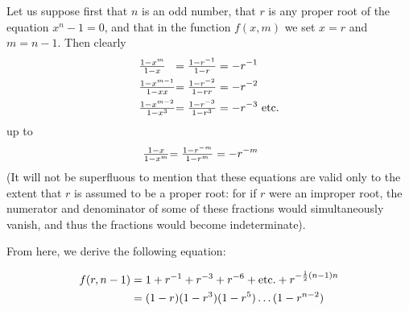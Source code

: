 \documentclass[twoside,12pt]{memoir}
\let\oldfrac\frac
\def\frac#1#2{\mathchoice{\tfrac{#1}{#2}}{\oldfrac{#1}{#2}}{\genfrac{}{}{}{2}{#1}{#2\mathstrut}}{\genfrac{}{}{}{3}{#1}{#2\mathstrut}}}
\begin{document}
Let us suppose first that \(n\) is an odd number, that \(r\) is any proper root of the equation \(x^{n}-1=0\), and that in the function \(f(x, m)\) we set \(x=r\) and \(m=n-1\). Then clearly
\[\begin{alignedat}[t]{3}
& \frac{1-x^{m}}{1-x}&=\frac{1-r^{-1}}{1-r}&=-r^{-1} \\
& \frac{1-x^{m-1}}{1-x x}&=\frac{1-r^{-2}}{1-r r}&=-r^{-2} \\
& \frac{1-x^{m-2}}{1-x^{3}}&=\frac{1-r^{-3}}{1-r^{3}}&=-r^{-3} \text{ etc{.}}
\end{alignedat}\]
up to
\[\begin{alignedat}[t]{3}
&\frac{1-x}{1-x^{m}}&=\frac{1-r^{-m}}{1-r^{m}}&=-r^{-m}\phantom{\text{etc{.}}}
\end{alignedat}\]
(It will not be superfluous to mention that these equations are valid only to the extent that \(r\) is assumed to be a proper root: for if \(r\) were an improper root, the numerator and denominator of some of these fractions would simultaneously vanish, and thus the fractions would become indeterminate).
%

From here, we derive the following equation:

\[\begin{aligned}
f(r, n-1) & =1+r^{-1}+r^{-3}+r^{-6}+\text{etc{.}}+r^{-\frac{1}{2}(n-1) n} \\
& =(1-r)(1-r^{3})(1-r^{5}) \ldots(1-r^{n-2})
\end{aligned}\]
%
\end{document}
